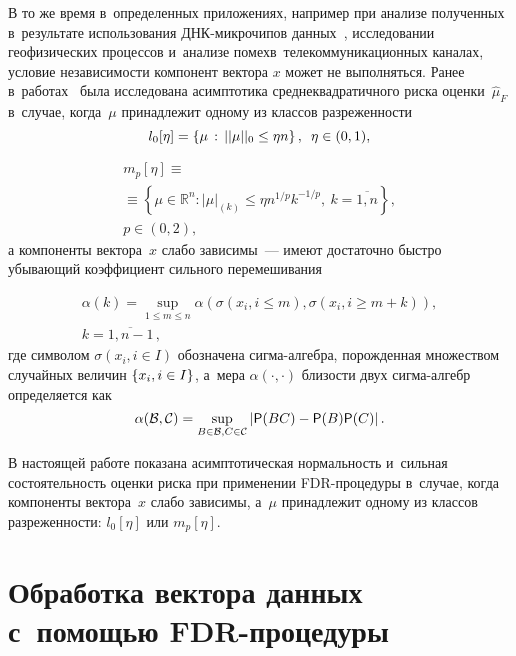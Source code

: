 \begin{multicols}{2}
В то же время в~определенных приложениях, например  при анализе полученных 
в~результате использования ДНК-мик\-ро\-чи\-пов данных~\cite{ResultsOnFDRUnderDependence}, исследовании геофизических процессов 
и~анализе помех\linebreak в~телекоммуникационных каналах, условие незави\-си\-мости компонент 
вектора $x$ может не выполняться. Ранее в~работах~\cite{VorontsovShestakov2023,Vorontsov2024} была \mbox{исследована} асимп\-то\-ти\-ка 
среднеквадратичного риска оценки~$\hat{\mu}_F$ \mbox{в~случае}, когда~$\mu$ принадлежит 
одному из классов разреженности
$$
l_0[\eta] = \left\{\mu\,:\, ||\mu||_0 \leq \eta n\right\}, \enskip \eta \in 
(0,1),
$$

\vspace*{-12pt}

\noindent
\begin{multline*}
m_p[\eta] \equiv{}\\
{}\equiv \left\{\mu \in \mathbb{R}^n : |\mu|_{(k)} \leq \eta n^{1/p} 
k^{-1/p},\ k=\overline{1,n}\right\}, \\
 p\in(0, 2),
\end{multline*}
а компоненты вектора~$x$ слабо зависимы~--- имеют достаточно быстро убывающий 
коэффициент сильного перемешивания~\cite{Bosq}

\noindent
\begin{multline*}
\alpha(k) = \sup\limits_{1\leq m\leq n}\alpha\left(\sigma(x_i, i\leq m), 
\sigma(x_i, i\geq m+k)\right), \\ 
k=\overline{1,n-1}\,,
\end{multline*}
где символом $\sigma(x_i, i\in I)$ обозначена сиг\-ма-ал\-геб\-ра, порожденная 
множеством случайных величин $\{x_i, i \hm\in I\}$, а~мера  $\alpha(\cdot, \cdot)$ 
близости двух сиг\-ма-ал\-гебр определяется как
$$
\alpha(\mathcal{B},\mathcal{C}) = \sup\limits_{B\in\mathcal{B}, 
C\in\mathcal{C}} \left|{\sf P}(BC)-{\sf P}(B){\sf P}(C)\right|.
$$

В настоящей работе показана асимптотическая нормальность и~сильная 
состоятельность оценки риска при применении FDR-про\-це\-ду\-ры в~случае, когда 
компоненты вектора~$x$ слабо зависимы, а~$\mu$ принадлежит одному из классов 
раз\-ре\-жен\-ности: 
$l_0[\eta]$ или $m_p[\eta]$.


\section{Обработка вектора данных с~помощью FDR-процедуры}


\end{multicols}
